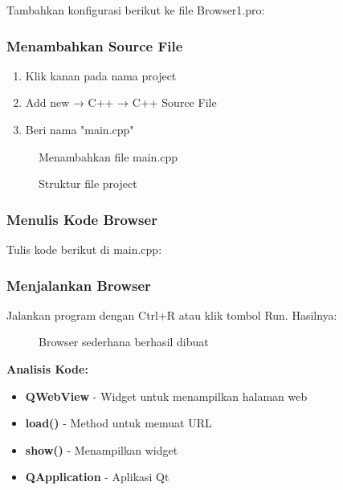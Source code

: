 Tambahkan konfigurasi berikut ke file Browser1.pro:



\subsubsection{Menambahkan Source File}

\begin{enumerate}
\item Klik kanan pada nama project
\item Add new → C++ → C++ Source File
\item Beri nama "main.cpp"
\end{enumerate}

\begin{figure}[htbp]
\centering
{}
\caption{Menambahkan file main.cpp}
\end{figure}

\begin{figure}[htbp]
\centering
{}
\caption{Struktur file project}
\end{figure}

\subsubsection{Menulis Kode Browser}

Tulis kode berikut di main.cpp:



\subsubsection{Menjalankan Browser}

Jalankan program dengan Ctrl+R atau klik tombol Run. Hasilnya:

\begin{figure}[htbp]
\centering
{}
\caption{Browser sederhana berhasil dibuat}
\end{figure}

\textbf{Analisis Kode:}
\begin{itemize}
\item \textbf{QWebView} - Widget untuk menampilkan halaman web
\item \textbf{load()} - Method untuk memuat URL
\item \textbf{show()} - Menampilkan widget
\item \textbf{QApplication} - Aplikasi Qt
\end{itemize}

